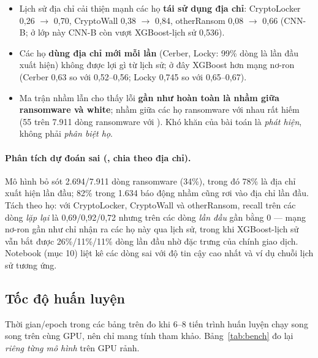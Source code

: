 \begin{itemize}
\item Lịch sử địa chỉ cải thiện mạnh các họ \textbf{tái sử dụng địa chỉ}: CryptoLocker 0,26 $\to$ 0,70, CryptoWall 0,38 $\to$ 0,84,
  otherRansom 0,08 $\to$ 0,66 (CNN-B; ở lớp này CNN-B còn vượt XGBoost-lịch sử 0,536).
\item Các họ \textbf{dùng địa chỉ mới mỗi lần} (Cerber, Locky: 99\% dòng là lần đầu xuất hiện) không được lợi gì từ lịch sử;
  ở đây XGBoost hơn mạng nơ-ron (Cerber 0,63 so với 0,52--0,56; Locky 0,745 so với 0,65--0,67).
\item Ma trận nhầm lẫn cho thấy lỗi \textbf{gần như hoàn toàn là nhầm giữa ransomware và white}; nhầm giữa các họ ransomware với
  nhau rất hiếm (55 trên 7.911 dòng ransomware với ). Khó khăn của bài toán là \emph{phát hiện}, không phải
  \emph{phân biệt họ}.
\end{itemize}

\paragraph{Phân tích dự đoán sai (, chia theo địa chỉ).} Mô hình bỏ sót 2.694/7.911 dòng ransomware (34\%), trong
đó 78\% là địa chỉ xuất hiện lần đầu; 82\% trong 1.634 báo động nhầm cũng rơi vào địa chỉ lần đầu. Tách theo họ: với CryptoLocker,
CryptoWall và otherRansom, recall trên các dòng \emph{lặp lại} là 0,69/0,92/0,72 nhưng trên các dòng \emph{lần đầu} gần bằng 0 ---
mạng nơ-ron gần như chỉ nhận ra các họ này qua lịch sử, trong khi XGBoost-lịch sử vẫn bắt được 26\%/11\%/11\% dòng lần đầu nhờ đặc
trưng của chính giao dịch. Notebook (mục 10) liệt kê các dòng sai với độ tin cậy cao nhất và ví dụ chuỗi lịch sử tương ứng.

\subsection{Tốc độ huấn luyện}

Thời gian/epoch trong các bảng trên đo khi 6--8 tiến trình huấn luyện chạy song song trên cùng GPU, nên chỉ mang tính tham khảo.
Bảng~\ref{tab:bench} đo lại \emph{riêng từng mô hình} trên GPU rảnh.


